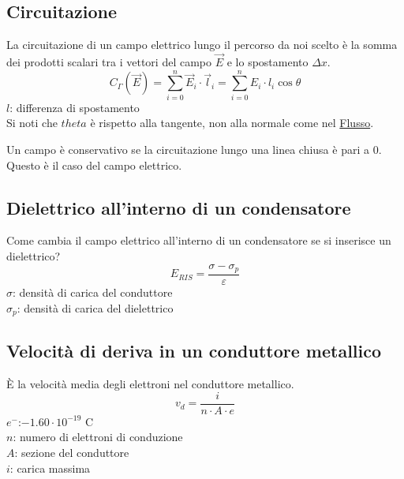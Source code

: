 \subsection{Circuitazione}
La circuitazione di un campo elettrico lungo il percorso da noi scelto è la somma dei prodotti 
scalari tra i vettori del campo $\vec{E}$ e lo spostamento $\Delta x$.
\begin{equation*}
  C_\Gamma\left(\vec{E}\right) = \sum\limits_{i=0}^{n}\vec{E}_i\cdot\vec{l}_i = 
  \sum\limits_{i=0}^{n} E_i\cdot l_i\cos\theta
\end{equation*}
$l$: differenza di spostamento\\
Si noti che $theta$ è rispetto alla tangente, non alla normale come nel 
\hyperref[subsec:flusso]{Flusso}.
\begin{center}
\end{center}
Un campo è conservativo se la circuitazione lungo una linea chiusa è pari a $0$. Questo è il
caso del campo elettrico.

\subsection{Dielettrico all'interno di un condensatore}
Come cambia il campo elettrico all'interno di un condensatore se si inserisce un dielettrico?
\begin{equation*}
  E_{RIS} = \frac{\sigma-\sigma_p}{\varepsilon}
\end{equation*}
$\sigma$: densità di carica del conduttore\\
$\sigma_p$: densità di carica del dielettrico

\subsection{Velocità di deriva in un conduttore metallico}
È la velocità media degli elettroni nel conduttore metallico.
\begin{equation*}
  v_d = \frac{i}{n\cdot A\cdot e}
\end{equation*}
\hyperref[tab:e-]{$e^-$}:$-1.60\cdot10^{-19}$ C\\
$n$: numero di elettroni di conduzione\\
$A$: sezione del conduttore\\
$i$: carica massima
